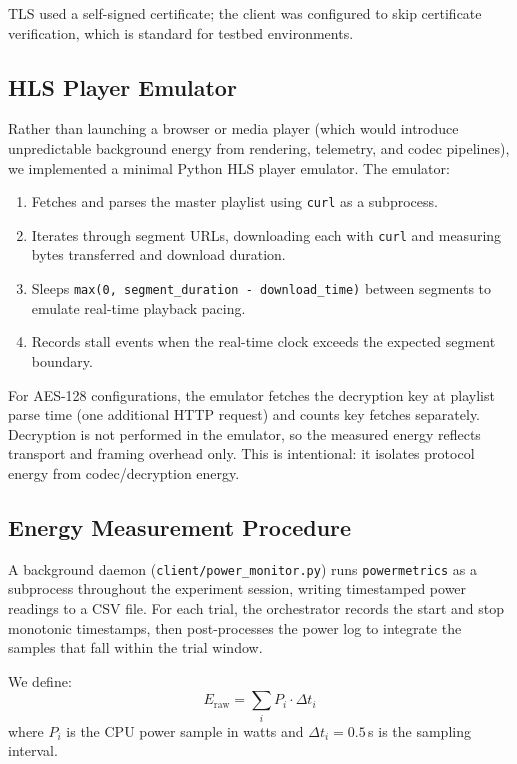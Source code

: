 \documentclass[conference]{IEEEtran}
\begin{document}
TLS used a self-signed certificate; the client was configured to skip certificate
verification, which is standard for testbed environments.

\subsection{HLS Player Emulator}

Rather than launching a browser or media player (which would introduce unpredictable
background energy from rendering, telemetry, and codec pipelines), we implemented a
minimal Python HLS player emulator. The emulator:
\begin{enumerate}
  \item Fetches and parses the master playlist using \texttt{curl} as a subprocess.
  \item Iterates through segment URLs, downloading each with \texttt{curl} and
    measuring bytes transferred and download duration.
  \item Sleeps \texttt{max(0, segment\_duration - download\_time)} between segments to
    emulate real-time playback pacing.
  \item Records stall events when the real-time clock exceeds the expected segment
    boundary.
\end{enumerate}

For AES-128 configurations, the emulator fetches the decryption key at playlist
parse time (one additional HTTP request) and counts key fetches separately. Decryption
is not performed in the emulator, so the measured energy reflects transport and
framing overhead only. This is intentional: it isolates protocol energy from
codec/decryption energy.

\subsection{Energy Measurement Procedure}

A background daemon (\texttt{client/power\_monitor.py}) runs \texttt{powermetrics}
as a subprocess throughout the experiment session, writing timestamped power readings
to a CSV file. For each trial, the orchestrator records the start and stop monotonic
timestamps, then post-processes the power log to integrate the samples that fall within
the trial window.

We define:
\begin{equation}
E_{\text{raw}} = \sum_{i} P_i \cdot \Delta t_i
\end{equation}
where $P_i$ is the CPU power sample in watts and $\Delta t_i = 0.5$\,s is the
sampling interval.
\end{document}
